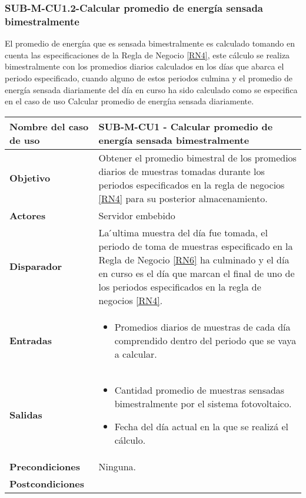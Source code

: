 \subsubsection{SUB-M-CU1.2-Calcular promedio de energía sensada bimestralmente}\label{SUB-M-CU1.2}
El  promedio  de  energíıa  que  es  sensada  bimestralmente  es  calculado  tomando  en  cuenta  las especificaciones de la Regla de Negocio \ref{RN4}, este cálculo se realiza bimestralmente con los promedios diarios calculados en los días que abarca el periodo especificado, cuando alguno de estos
periodos culmina y el promedio de energía sensada diariamente del día en curso ha sido calculado como se especifica en el caso de uso Calcular promedio de energíıa sensada diariamente.


\begin{longtable}{|J{5cm}|J{10.3cm}|}
	\hline
	\textbf{Nombre del caso de uso} &
		SUB-M-CU1 - Calcular promedio de energía sensada bimestralmente
 \\ \hline
	\textbf{Objetivo} &
		Obtener  el  promedio  bimestral  de  los  promedios  diarios  de muestras tomadas durante los periodos especificados en la regla de negocios  \ref{RN4} para su posterior almacenamiento.
 \\ \hline
	\textbf{Actores} &
		Servidor embebido \\ \hline 
	\textbf{Disparador} & 
		La  ́ultima muestra del día fue tomada, el periodo de toma de muestras especificado en la Regla de Negocio \ref{RN6} ha culminado y el día en curso es el día que marcan el final de uno de los periodos especificados en la regla de negocios \ref{RN4}. \\ \hline 
	\textbf{Entradas} & 
		\begin{itemize}
				\item Promedios diarios de muestras de cada día comprendido dentro del periodo que se vaya a calcular.
		\end{itemize}\\ \hline 
	\textbf{Salidas} & 
		\begin{itemize}
			\item Cantidad promedio de muestras sensadas bimestralmente por el sistema fotovoltaico.
			\item Fecha del día actual en la que se realizá el cálculo.
		\end{itemize} \\ \hline
	\textbf{Precondiciones} &
		Ninguna.\\ \hline
	\textbf{Postcondiciones} &

\end{longtable}
